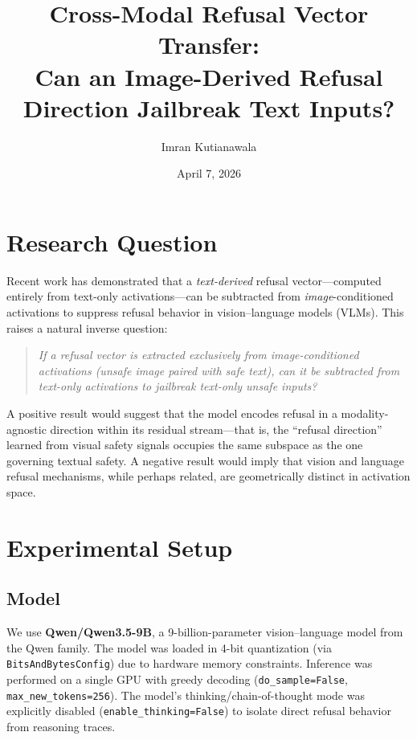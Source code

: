 \documentclass[11pt]{article}
\title{Cross-Modal Refusal Vector Transfer:\\Can an Image-Derived Refusal Direction Jailbreak Text Inputs?}
\author{Imran Kutianawala}
\date{April 7, 2026}
\begin{document}
\maketitle

\section{Research Question}

Recent work has demonstrated that a \textit{text-derived} refusal vector---computed entirely from text-only activations---can be subtracted from \textit{image}-conditioned activations to suppress refusal behavior in vision--language models (VLMs). This raises a natural inverse question:

\begin{quote}
\textit{If a refusal vector is extracted exclusively from image-conditioned activations (unsafe image paired with safe text), can it be subtracted from text-only activations to jailbreak text-only unsafe inputs?}
\end{quote}

A positive result would suggest that the model encodes refusal in a modality-agnostic direction within its residual stream---that is, the ``refusal direction'' learned from visual safety signals occupies the same subspace as the one governing textual safety. A negative result would imply that vision and language refusal mechanisms, while perhaps related, are geometrically distinct in activation space.

\section{Experimental Setup}

\subsection{Model}

We use \textbf{Qwen/Qwen3.5-9B}, a 9-billion-parameter vision--language model from the Qwen family. The model was loaded in 4-bit quantization (via \texttt{BitsAndBytesConfig}) due to hardware memory constraints. Inference was performed on a single GPU with greedy decoding (\texttt{do\_sample=False}, \texttt{max\_new\_tokens=256}). The model's thinking/chain-of-thought mode was explicitly disabled (\texttt{enable\_thinking=False}) to isolate direct refusal behavior from reasoning traces.
\end{document}
